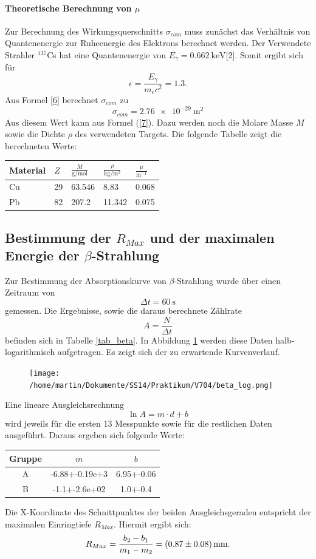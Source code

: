 \documentclass[11pt,ngerman,a4paper]{article}
\begin{document}
\paragraph{Theoretische Berechnung von $\mu$}
Zur Berechnung des Wirkungsquerschnitts $\sigma_{com}$ muss zunächst das Verhältnis von Quantenenergie zur Ruheenergie des Elektrons berechnet werden. Der Verwendete Strahler ${}^{137}$Cs  hat eine Quantenenergie von $E_\gamma = \SI{0.662}{\kilo\eV}$[2]. Somit ergibt sich für 
\[
\epsilon =  \frac{E_\gamma}{m_ec^2} = \num{1.3}.
\]
Aus Formel \ref{6} berechnet $\sigma_{com}$ zu
\[
\sigma_{com} = \SI{2.76e-29}{\meter\squared}
\]
Aus diesem Wert kann aus Formel (\ref{7}). Dazu werden noch die Molare Masse $M$ sowie die Dichte $\rho$ des verwendeten Targets. Die folgende Tabelle zeigt die berechneten Werte:
\begin{table}[h]
\centering
\begin{tabular}{lllll}
\toprule
	Material & $Z$ & $\frac{M}{\si{\gram\per\mole}}$ &$\frac{\rho}{\si{\kilo\gram\per\meter\squared}}$ &$\frac{\mu}{\si{\meter^{-1}}}$ \\
\midrule
	Cu & 29 &63.546  &8.83 & 0.068\\
	Pb &82 & 207.2& 11.342 & 0.075    \\
\bottomrule
\end{tabular}

\end{table} 
\subsection{Bestimmung der $R_{Max}$ und der maximalen Energie der $\beta$-Strahlung}
Zur Bestimmung der Absorptionskurve von $\beta$-Strahlung wurde über einen Zeitraum von
\[
\Delta t = \SI{60}{\second}
\]
gemessen. Die Ergebnisse, sowie die daraus berechnete Zählrate
\[
A = \frac{N}{\Delta t}
\]
befinden sich in Tabelle \ref{tab_beta}. In Abbildung \ref{abb_beta} werden diese Daten halb-logarithmisch aufgetragen. Es zeigt sich der zu erwartende Kurvenverlauf. 
\begin{figure}[htp]
\centering
\texttt{[image: /home/martin/Dokumente/SS14/Praktikum/V704/beta\_log.png]}
\caption{}
\label{abb_beta}
\end{figure}
\newpage
Eine lineare Ausgleichsrechnung
\[
\ln{A} = m\cdot d + b
\]
wird jeweils für die ersten 13 Messpunkte sowie für die restlichen Daten ausgeführt. Daraus ergeben sich folgende Werte:
\begin{table}[h]
\centering
\begin{tabular}{cSS}
	\toprule
	Gruppe & $m$ & $b$\\
	\midrule
	A & -6.88+-0.19e+3 & 6.95+-0.06 \\
	B & -1.1+-2.6e+02 & 1.0+-0.4\\
	\bottomrule
\end{tabular}

\end{table}
Die X-Koordinate des Schnittpunktes der beiden Ausgleichsgeraden entspricht der maximalen Einringtiefe $R_{Max}$. Hiermit ergibt sich:
\begin{equation}
R_{Max} = \frac{b_2-b_1}{m_1-m_2} = \SI{0.87+-0.08}{\milli\meter}.
\end{equation}
\end{document}
